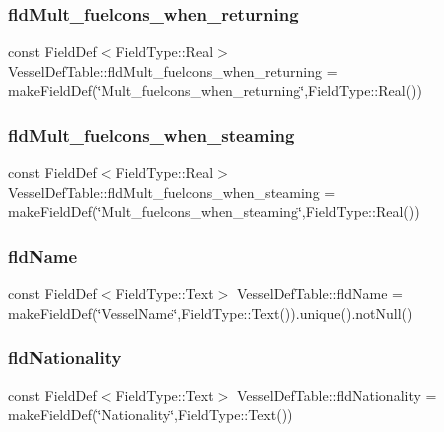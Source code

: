 \subsubsection{\texorpdfstring{fldMult\_fuelcons\_when\_returning}{fldMult\_fuelcons\_when\_returning}}
{\footnotesize\ttfamily const Field\+Def$<$Field\+Type\+::\+Real$>$ Vessel\+Def\+Table\+::fld\+Mult\+\_\+fuelcons\+\_\+when\+\_\+returning = make\+Field\+Def(\char`\"{}Mult\+\_\+fuelcons\+\_\+when\+\_\+returning\char`\"{},Field\+Type\+::\+Real())}

\mbox{\label{class_vessel_def_table_a062621fbd795bb47650695d86fee82b9}} 
\subsubsection{\texorpdfstring{fldMult\_fuelcons\_when\_steaming}{fldMult\_fuelcons\_when\_steaming}}
{\footnotesize\ttfamily const Field\+Def$<$Field\+Type\+::\+Real$>$ Vessel\+Def\+Table\+::fld\+Mult\+\_\+fuelcons\+\_\+when\+\_\+steaming = make\+Field\+Def(\char`\"{}Mult\+\_\+fuelcons\+\_\+when\+\_\+steaming\char`\"{},Field\+Type\+::\+Real())}

\mbox{\label{class_vessel_def_table_a0a97ab7cbc9575cc30e20b4731bf3604}} 
\subsubsection{\texorpdfstring{fldName}{fldName}}
{\footnotesize\ttfamily const Field\+Def$<$Field\+Type\+::\+Text$>$ Vessel\+Def\+Table\+::fld\+Name = make\+Field\+Def(\char`\"{}Vessel\+Name\char`\"{},Field\+Type\+::\+Text()).unique().not\+Null()}

\mbox{\label{class_vessel_def_table_a86ae9328894bba7a8d1720e636634433}} 
\subsubsection{\texorpdfstring{fldNationality}{fldNationality}}
{\footnotesize\ttfamily const Field\+Def$<$Field\+Type\+::\+Text$>$ Vessel\+Def\+Table\+::fld\+Nationality = make\+Field\+Def(\char`\"{}Nationality\char`\"{},Field\+Type\+::\+Text())}

